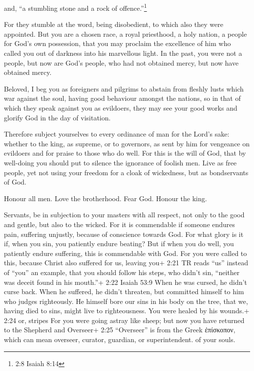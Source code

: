  and, ``a stumbling stone and a rock of
offence.''\footnote{2:8 Isaiah 8:14}

For they stumble at the word, being disobedient, to which also they were
appointed.  But you are a chosen race, a royal priesthood, a
holy nation, a people for God's own possession, that you may proclaim
the excellence of him who called you out of darkness into his marvellous
light.  In the past, you were not a people, but now are
God's people, who had not obtained mercy, but now have obtained mercy.

 Beloved, I beg you as foreigners and pilgrims to abstain
from fleshly lusts which war against the soul,  having good
behaviour amongst the nations, so in that of which they speak against
you as evildoers, they may see your good works and glorify God in the
day of visitation.

 Therefore subject yourselves to every ordinance of man for
the Lord's sake: whether to the king, as supreme,  or to
governors, as sent by him for vengeance on evildoers and for praise to
those who do well.  For this is the will of God, that by
well-doing you should put to silence the ignorance of foolish men.
 Live as free people, yet not using your freedom for a
cloak of wickedness, but as bondservants of God.

 Honour all men. Love the brotherhood. Fear God. Honour the
king.

 Servants, be in subjection to your masters with all
respect, not only to the good and gentle, but also to the wicked.
 For it is commendable if someone endures pain, suffering
unjustly, because of conscience towards God.  For what
glory is it if, when you sin, you patiently endure beating? But if when
you do well, you patiently endure suffering, this is commendable with
God.  For you were called to this, because Christ also
suffered for us, leaving you+ 2:21 TR reads ``us'' instead of ``you'' an
example, that you should follow his steps,  who didn't sin,
``neither was deceit found in his mouth.''+ 2:22 Isaiah 53:9
 When he was cursed, he didn't curse back. When he
suffered, he didn't threaten, but committed himself to him who judges
righteously.  He himself bore our sins in his body on the
tree, that we, having died to sins, might live to righteousness. You
were healed by his wounds.+ 2:24 or, stripes  For you were
going astray like sheep; but now you have returned to the Shepherd and
Overseer+ 2:25 ``Overseer'' is from the Greek ἐπίσκοπον, which can mean
overseer, curator, guardian, or superintendent. of your souls.

